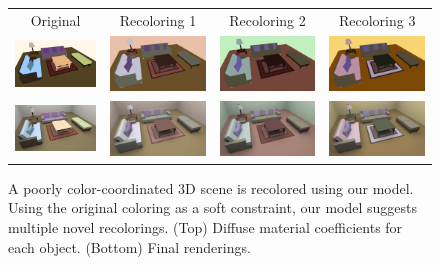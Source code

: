 \begin{figure}[ht]
\begin{tabular}{c|ccc} 
Original&Recoloring 1&Recoloring 2&Recoloring 3\vspace{0.4em}\\
\includegraphics[width=.23\linewidth]{figs/3dscene/original}&\includegraphics[width=.23\linewidth]{figs/3dscene/recolored_17}&\includegraphics[width=.23\linewidth]{figs/3dscene/recolored_03}&\includegraphics[width=.23\linewidth]{figs/3dscene/recolored_15}\vspace{0.4em}\\
\includegraphics[width=.23\linewidth]{figs/3dscene/original_pbrt}&\includegraphics[width=.23\linewidth]{figs/3dscene/recolored_17_pbrt}&\includegraphics[width=.23\linewidth]{figs/3dscene/recolored_03_pbrt}&\includegraphics[width=.23\linewidth]{figs/3dscene/recolored_15_pbrt}\vspace{0.4em}\\
\end{tabular}

\caption{A poorly color-coordinated 3D scene is recolored using our model. Using the original coloring as a soft constraint, our model suggests multiple novel recolorings. (Top) Diffuse material coefficients for each object. (Bottom) Final renderings.}
\label{fig:sceneRecoloring}
\vspace{-1.0em}
\end{figure}